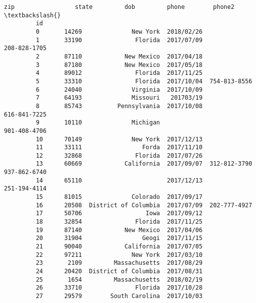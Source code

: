\documentclass[11pt]{article}
\begin{document}
\begin{Verbatim}[commandchars=\\\{\}]
                   zip                 state         dob         phone        phone2  \textbackslash{}
         id                                                                            
         0       14269              New York  2018/02/26                               
         1       33190               Florida  2017/07/09                208-828-1705   
         2       87110            New Mexico  2017/04/18                               
         3       87180            New Mexico  2017/05/18                               
         4       89012               Florida  2017/11/25                               
         5       33310               Florida  2017/10/04  754-813-8556                 
         6       24040              Virginia  2017/10/09                               
         7       64193              Missouri   201703/19                               
         8       85743          Pennsylvania  2017/10/08                616-841-7225   
         9       10110              Michigan                            901-408-4706   
         10      70149              New York  2017/12/13                               
         11      33111                 Forda  2017/11/10                               
         12      32868               Florida  2017/07/26                               
         13      60669            California  2017/09/07  312-812-3790  937-862-6740   
         14      65110                        2017/12/13                251-194-4114   
         15      81015              Colorado  2017/09/17                               
         16      20508  District of Columbia  2017/07/09  202-777-4927                 
         17      50706                  Iowa  2017/09/12                               
         18      32854               Florida  2017/11/25                               
         19      87140            New Mexico  2017/04/06                               
         20      31904                 Geogi  2017/11/15                               
         21      90040            California  2017/07/05                               
         22      97211              New York  2017/03/10                               
         23       2109         Massachusetts  2017/08/29                               
         24      20420  District of Columbia  2017/08/31                               
         25       1654         Massachusetts  2018/02/19                               
         26      33710               Florida  2017/10/28                               
         27      29579        South Carolina  2017/10/03                               

\end{Verbatim}
\end{document}
